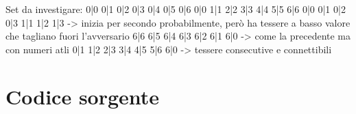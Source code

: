 \documentclass[a4paper.12pt]{report} %
\begin{document}
Set da investigare:
0|0 0|1 0|2 0|3 0|4 0|5 0|6
0|0 1|1 2|2 3|3 4|4 5|5 6|6
0|0 0|1 0|2 0|3 1|1 1|2 1|3 -> inizia per secondo probabilmente, però ha tessere a basso valore che tagliano fuori l'avversario
6|6 6|5 6|4 6|3 6|2 6|1 6|0 -> come la precedente ma con numeri atli
0|1 1|2 2|3 3|4 4|5 5|6 6|0 -> tessere consecutive e connettibili




\appendix
\chapter{Codice sorgente}

\end{document}

